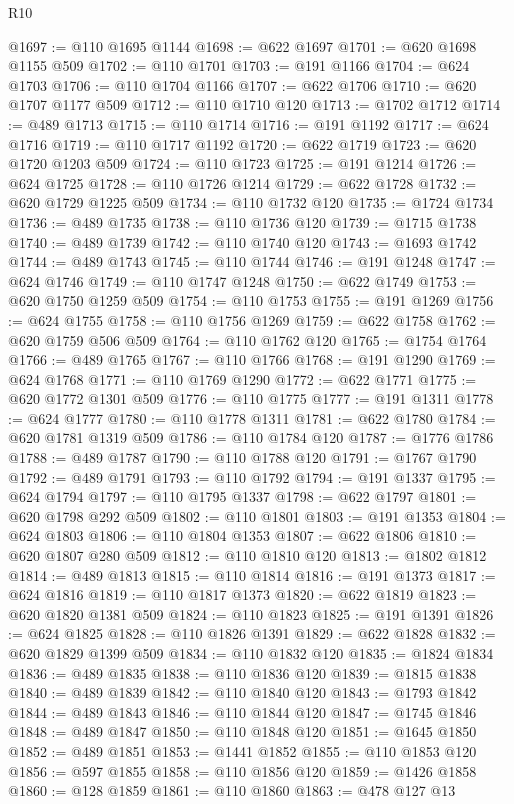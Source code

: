 \begin{lexlean}{R10}
\begin{coremodule}
{{{{{{{{{{{{{{{{{{{{{{{{{{{{{{{{{{{{{{{{{{{{{{{{{{{{{{{{{{{{{{{{{{{{{{{{{{{{{{{{{{{{@1697 := @110 @1695 @1144
@1698 := @622 @1697
@1701 := @620 @1698 @1155 @509
@1702 := @110 @1701
@1703 := @191 @1166
@1704 := @624 @1703
@1706 := @110 @1704 @1166
@1707 := @622 @1706
@1710 := @620 @1707 @1177 @509
@1712 := @110 @1710 @120
@1713 := @1702 @1712
@1714 := @489 @1713
@1715 := @110 @1714
@1716 := @191 @1192
@1717 := @624 @1716
@1719 := @110 @1717 @1192
@1720 := @622 @1719
@1723 := @620 @1720 @1203 @509
@1724 := @110 @1723
@1725 := @191 @1214
@1726 := @624 @1725
@1728 := @110 @1726 @1214
@1729 := @622 @1728
@1732 := @620 @1729 @1225 @509
@1734 := @110 @1732 @120
@1735 := @1724 @1734
@1736 := @489 @1735
@1738 := @110 @1736 @120
@1739 := @1715 @1738
@1740 := @489 @1739
@1742 := @110 @1740 @120
@1743 := @1693 @1742
@1744 := @489 @1743
@1745 := @110 @1744
@1746 := @191 @1248
@1747 := @624 @1746
@1749 := @110 @1747 @1248
@1750 := @622 @1749
@1753 := @620 @1750 @1259 @509
@1754 := @110 @1753
@1755 := @191 @1269
@1756 := @624 @1755
@1758 := @110 @1756 @1269
@1759 := @622 @1758
@1762 := @620 @1759 @506 @509
@1764 := @110 @1762 @120
@1765 := @1754 @1764
@1766 := @489 @1765
@1767 := @110 @1766
@1768 := @191 @1290
@1769 := @624 @1768
@1771 := @110 @1769 @1290
@1772 := @622 @1771
@1775 := @620 @1772 @1301 @509
@1776 := @110 @1775
@1777 := @191 @1311
@1778 := @624 @1777
@1780 := @110 @1778 @1311
@1781 := @622 @1780
@1784 := @620 @1781 @1319 @509
@1786 := @110 @1784 @120
@1787 := @1776 @1786
@1788 := @489 @1787
@1790 := @110 @1788 @120
@1791 := @1767 @1790
@1792 := @489 @1791
@1793 := @110 @1792
@1794 := @191 @1337
@1795 := @624 @1794
@1797 := @110 @1795 @1337
@1798 := @622 @1797
@1801 := @620 @1798 @292 @509
@1802 := @110 @1801
@1803 := @191 @1353
@1804 := @624 @1803
@1806 := @110 @1804 @1353
@1807 := @622 @1806
@1810 := @620 @1807 @280 @509
@1812 := @110 @1810 @120
@1813 := @1802 @1812
@1814 := @489 @1813
@1815 := @110 @1814
@1816 := @191 @1373
@1817 := @624 @1816
@1819 := @110 @1817 @1373
@1820 := @622 @1819
@1823 := @620 @1820 @1381 @509
@1824 := @110 @1823
@1825 := @191 @1391
@1826 := @624 @1825
@1828 := @110 @1826 @1391
@1829 := @622 @1828
@1832 := @620 @1829 @1399 @509
@1834 := @110 @1832 @120
@1835 := @1824 @1834
@1836 := @489 @1835
@1838 := @110 @1836 @120
@1839 := @1815 @1838
@1840 := @489 @1839
@1842 := @110 @1840 @120
@1843 := @1793 @1842
@1844 := @489 @1843
@1846 := @110 @1844 @120
@1847 := @1745 @1846
@1848 := @489 @1847
@1850 := @110 @1848 @120
@1851 := @1645 @1850
@1852 := @489 @1851
@1853 := @1441 @1852
@1855 := @110 @1853 @120
@1856 := @597 @1855
@1858 := @110 @1856 @120
@1859 := @1426 @1858
@1860 := @128 @1859
@1861 := @110 @1860
@1863 := @478 @127 @13
}}}}}}}}}}}}}}}}}}}}}}}}}}}}}}}}}}}}}}}}}}}}}}}}}}}}}}}}}}}}}}}}}}}}}}}}}}}}}}}}}}}}
\end{coremodule}
\end{lexlean}
